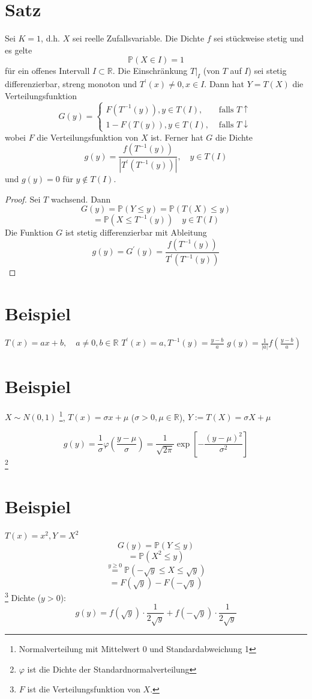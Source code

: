 \documentclass[a4paper,11pt,notitlepage]{report}
\newcommand{\R}{{\ensuremath{\mathbb{R}}}}
\newcommand{\Prim}{{\ensuremath{\mathbb{P}}}}
\begin{document}
\section{Satz}
Sei $K=1$, d.h. $X$ sei reelle Zufallsvariable. Die Dichte $f$ sei stückweise stetig und es gelte 
$$\Prim(X \in I) = 1$$
für ein offenes Intervall $I \subset \R$. Die Einschränkung $T \big |_I$ (von $T$ auf $I$) sei stetig differenzierbar, streng monoton und $T^\prime(x) \neq 0, x \in I$.
Dann hat $Y=T(X)$ die Verteilungsfunktion
$$G(y) = \begin{cases} F(T^{-1}(y)), y \in T(I), & \text{ falls } T \uparrow \\
1-F(T(y)), y \in T(I), & \text{ falls } T \downarrow \end{cases}$$
wobei $F$ die Verteilungsfunktion von $X$ ist. Ferner hat
$G$ die Dichte
$$g(y) = \frac{f(T^{-1}(y))}{|T^\prime(T^{-1}(y))|}, \quad y \in T(I)$$
und $g(y) = 0$ für $y \notin T(I)$.

\begin{proof}
	Sei $T$ wachsend. Dann
	$$G(y) = \Prim(Y \leq y) = \Prim(T(X) \leq y)$$
	$$= \Prim(X \leq T^{-1}(y)) \quad y \in T(I)$$
	Die Funktion $G$ ist stetig differenzierbar mit Ableitung 
	$$g(y) = G^\prime(y) = \frac{f(T^{-1}(y))}{T^\prime(T^{-1}(y))}$$
\end{proof}

\section{Beispiel}
$T(x) = ax+b, \quad a \neq 0, b \in \R$ \newline
$T^\prime(x) = a, T^{-1}(y) = \frac{y-b}{a}$ \newline
$g(y) = \frac{1}{|a|} f(\frac{y-b}{a})$

\section{Beispiel}
$X \sim N(0,1)$ \footnote{Normalverteilung mit Mittelwert 0 und Standardabweichung 1},
$T(x) = \sigma x + \mu$ ($\sigma > 0, \mu \in \R$), $Y:= T(X) = \sigma X+\mu$

$$g(y) = \frac{1}{\sigma} \varphi(\frac{y-\mu}{\sigma}) = \frac{1}{\sqrt{2 \pi}} \exp [- \frac{(y-\mu)^2}{\sigma^2}]$$ \footnote{$\varphi$ ist die Dichte der Standardnormalverteilung}

\section{Beispiel}
$T(x) = x^2, Y = X^2$
$$G(y) = \Prim(Y \leq y)$$
$$= \Prim(X^2 \leq y)$$
$$\overset{y \geq 0}{=} \Prim(- \sqrt{y} \leq X \leq \sqrt{y})$$
$$= F(\sqrt{y}) - F(-\sqrt{y})$$
\footnote{$F$ ist die Verteilungsfunktion von $X$.}
Dichte ($y>0$):
$$g(y) = f(\sqrt{y}) \cdot \frac{1}{2 \sqrt{y}} + f(-\sqrt{y}) \cdot \frac{1}{2 \sqrt{y}}$$
\end{document}
